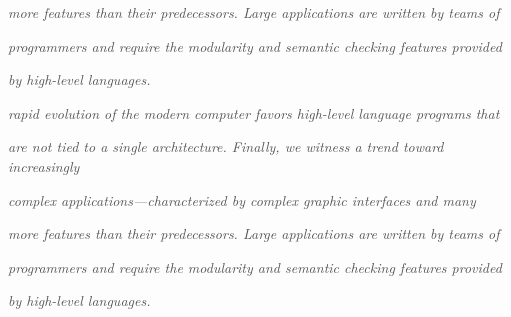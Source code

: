 \documentclass[12pt]{article}
\begin{document}
\begin{adjustwidth}{0.5in}{0.0in}
\textit{\textcolor[HTML]{525252}{more features than their predecessors. Large applications are written by teams of}}\par

\end{adjustwidth}

\begin{adjustwidth}{0.5in}{0.0in}
\textit{\textcolor[HTML]{525252}{programmers and require the modularity and semantic checking features provided}}\par

\end{adjustwidth}

\begin{adjustwidth}{0.5in}{0.0in}
\textit{\textcolor[HTML]{525252}{by high-level languages.}}{\fontsize{2pt}{2.4pt}\selectfont  \par}\textit{\textcolor[HTML]{525252}{rapid evolution of the modern computer favors high-level language programs that}}\par

\end{adjustwidth}

\begin{adjustwidth}{0.5in}{0.0in}
\textit{\textcolor[HTML]{525252}{are not tied to a single architecture. Finally, we witness a trend toward increasingly}}\par

\end{adjustwidth}

\begin{adjustwidth}{0.5in}{0.0in}
\textit{\textcolor[HTML]{525252}{complex applications—characterized by complex graphic interfaces and many}}\par

\end{adjustwidth}

\begin{adjustwidth}{0.5in}{0.0in}
\textit{\textcolor[HTML]{525252}{more features than their predecessors. Large applications are written by teams of}}\par

\end{adjustwidth}

\begin{adjustwidth}{0.5in}{0.0in}
\textit{\textcolor[HTML]{525252}{programmers and require the modularity and semantic checking features provided}}\par

\end{adjustwidth}

\begin{adjustwidth}{0.5in}{0.0in}
\textit{\textcolor[HTML]{525252}{by high-level languages.}}\par

\end{adjustwidth}


\printbibliography
\end{document}
